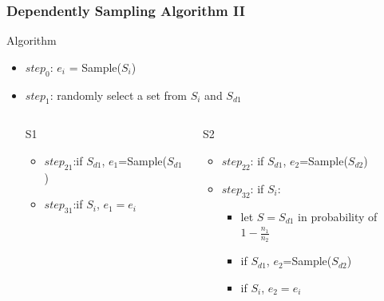 \documentclass[notheorems, aspectratio=54]{beamer}
\begin{document}
\begin{frame}
    \frametitle{Dependently Sampling Algorithm II}
    \begin{block}{Algorithm}
        \begin{itemize}
            \item $step_{0}$: $e_i$ = Sample($S_i$)
            \item $step_{1}$: randomly select a set from $S_i$ and $S_{d1}$
            \begin{columns}
                \begin{column}{0.48\textwidth}
                    \begin{alertblock}{S1}
                        \begin{itemize}
                            \item $step_{21}$:if $S_{d1}$, $e_1$=Sample($S_{d1}$)
                            \item $step_{31}$:if $S_i$, $e_1 = e_i$
                        \end{itemize}
                    \end{alertblock}
                    \end{column}
                    \begin{column}{0.48\textwidth}
                    \begin{alertblock}{S2}
                        \begin{itemize}
                            \item $step_{22}$: if $S_{d1}$, $e_2$=Sample($S_{d2}$)
                            \item $step_{32}$: if $S_i$:
                            \begin{itemize}
                                \item let $S = S_{d1}$ in probability of $1-\frac{n_1}{n_2}$
                                \item if $S_{d1}$, $e_2$=Sample($S_{d2}$)
                                \item if $S_i$, $e_2 = e_i$
                            \end{itemize}
                        \end{itemize}
                    \end{alertblock}
                \end{column}
            \end{columns}
        \end{itemize}
    \end{block}
    

\end{frame}
\end{document}
